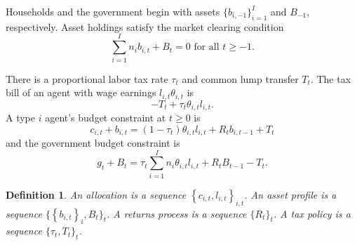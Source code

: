 \documentclass[thmsb,11pt]{article}
\newtheorem{definition}{Definition}
\begin{document}
Households and the government begin with  assets $%
\{b_{i,-1}\}_{i=1}^{I}$ and $B_{-1}$, respectively. Asset holdings
satisfy the market clearing condition%
\begin{equation}
\label{feasibility bonds}
\sum_{i=1}^{I}n _{i}b_{i,t}+B_{t}=0\text{ for all }t\geq -1.
\end{equation}%
\color{black}


There is a proportional labor tax rate $\tau_t$ and common lump transfer $T_t$.
The tax bill of an agent with wage earnings $l_{i,t}\theta_{i,t}$
is
\[
-T_{t}+\tau_{t}\theta_{i,t}l_{i,t}.
\]
A type $i$ agent's  budget constraint at $t \geq 0$ is%
\begin{equation}
c_{i,t}+b_{i,t}=\left( 1-\tau _{t}\right) \theta
_{i,t}l_{i,t}+R_{t}b_{i,t-1}+T_{t} \label{agent bc affine}
\end{equation}
%
and the government budget constraint is%
\begin{equation}
g_{t}+B_{t}=\tau _{t}\sum_{i=1}^{I}n_{i}\theta
_{i,t}l_{i,t}+R_{t}B_{t-1} -T_{t}.  \label{govmt bc affine}
\end{equation}%


\begin{definition}
\label{Def:components} An \emph{allocation} is a sequence $\left \{
c_{i,t},l_{i,t}\right \} _{i,t}$. An \emph{asset profile} is a sequence $\{
\left \{ b_{i,t}\right \} _{i},B_{t}\}_{t}$. A \emph{returns process} is a sequence $\{R_{t}\}_{t}$. A \emph{tax policy} is a sequence $%
\{ \tau _{t},T_{t}\}_{t}$.
\end{definition}
%
\end{document}
